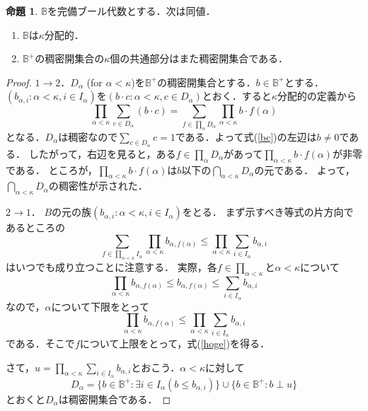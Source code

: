 \documentclass[uplatex,dvipdfmx]{jsarticle}
\newcommand{\B}{\mathbb{B}}
\theoremstyle{definition}
\newtheorem{prop}[thm]{命題}
\theoremstyle{named}
\begin{document}
\begin{prop}\cite[Lemma 7.16.]{jech2007set}
$\B$を完備ブール代数とする．次は同値．
\begin{enumerate}
    \item $\B$は$\kappa$分配的．
    \item $\B^+$の稠密開集合の$\kappa$個の共通部分はまた稠密開集合である．
\end{enumerate}
\end{prop}
\begin{proof}
$1 \rightarrow 2$．$D_\alpha$ (for $\alpha < \kappa$)を$\B^+$の稠密開集合とする．$b \in \B^+$とする．
$(b_{\alpha,i} : \alpha < \kappa, i \in I_\alpha)$を$(b \cdot c : \alpha < \kappa, c \in D_\alpha)$とおく．すると$\kappa$分配的の定義から
\begin{equation}
\prod_{\alpha < \kappa} \sum_{c \in D_\alpha} (b \cdot c) = \sum_{f \in \prod_\alpha D_\alpha} \prod_{\alpha < \kappa} b \cdot f(\alpha) \label{bc}
\end{equation}
となる．$D_\alpha$は稠密なので$\sum_{c \in D_\alpha} c = 1$である．よって式(\ref{bc})の左辺は$b \ne 0$である．
したがって，右辺を見ると，ある$f \in \prod_\alpha D_\alpha$があって$\prod_{\alpha < \kappa} b \cdot f(\alpha)$が非零である．
ところが，$\prod_{\alpha < \kappa} b \cdot f(\alpha)$は$b$以下の$\bigcap_{\alpha < \kappa} D_\alpha$の元である．
よって，$\bigcap_{\alpha < \kappa} D_\alpha$の稠密性が示された．

$2 \rightarrow 1$．
$B$の元の族$(b_{\alpha,i} : \alpha < \kappa, i \in I_\alpha)$をとる．
まず示すべき等式の片方向であるところの
\begin{equation}
\sum_{f \in \prod_{\alpha < \kappa} I_\alpha} \prod_{\alpha < \kappa} b_{\alpha,f(\alpha)} \le \prod_{\alpha < \kappa} \sum_{i \in I_\alpha} b_{\alpha,i} \label{hoge}
\end{equation}
はいつでも成り立つことに注意する．
実際，各$f \in \prod_{\alpha < \kappa}$と$\alpha < \kappa$について
\[
\prod_{\alpha < \kappa} b_{\alpha,f(\alpha)} \le b_{\alpha,f(\alpha)} \le \sum_{i \in I_\alpha} b_{\alpha,i}
\]
なので，$\alpha$について下限をとって
\[
\prod_{\alpha < \kappa} b_{\alpha,f(\alpha)} \le \prod_{\alpha < \kappa} \sum_{i \in I_\alpha} b_{\alpha,i}
\]
である．そこで$f$について上限をとって，式(\ref{hoge})を得る．

さて，$u = \prod_{\alpha < \kappa} \sum_{i \in I_\alpha} b_{\alpha,i}$とおこう．$\alpha < \kappa$に対して
\[
D_\alpha = \{ b \in \B^+ : \exists i \in I_\alpha (b \le b_{\alpha,i}) \} \cup \{ b \in \B^+ : b \perp u \}
\]
とおくと$D_\alpha$は稠密開集合である．


\end{proof}
\end{document}
